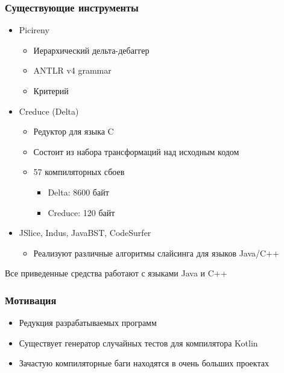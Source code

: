 \begin{frame}
	\frametitle{Существующие инструменты}
	\begin{itemize}
		\item Picireny
			\begin{itemize}
				\item Иерархический дельта-дебаггер
				\item ANTLR v4 grammar
				\item Критерий
			\end{itemize}
		\item Creduce (Delta)
			\begin{itemize}
				\item Редуктор для языка C
				\item Состоит из набора трансформаций над исходным кодом
				\item 57 компиляторных сбоев
				\begin{itemize}
					\item Delta: 8600 байт
					\item Creduce: 120 байт
				\end{itemize}
			\end{itemize}
		\item JSlice, Indus, JavaBST, CodeSurfer
			\begin{itemize}
				\item Реализуют различные алгоритмы слайсинга для языков Java/C++
			\end{itemize}
	\end{itemize}
	Все приведенные средства работают с языками Java и C++
\end{frame}

\begin{frame}
	\frametitle{Мотивация}
	\begin{itemize}
		\item Редукция разрабатываемых программ
		\item Существует генератор случайных тестов для компилятора Kotlin
		\item Зачастую компиляторные баги находятся в очень больших проектах
	\end{itemize}
\end{frame}

